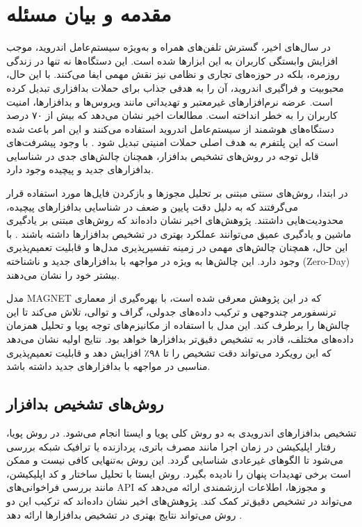 \section{مقدمه و بیان مسئله}\label{intro}
در سال‌های اخیر، گسترش تلفن‌های همراه و به‌ویژه سیستم‌عامل اندروید، موجب افزایش وابستگی کاربران به این ابزارها شده است. این دستگاه‌ها نه تنها در زندگی روزمره، بلکه در حوزه‌های تجاری و نظامی نیز نقش مهمی ایفا می‌کنند. با این حال، محبوبیت و فراگیری اندروید، آن را به هدفی جذاب برای حملات بدافزاری تبدیل کرده است. عرضه نرم‌افزارهای غیرمعتبر و تهدیداتی مانند ویروس‌ها و بدافزارها، امنیت کاربران را به خطر انداخته است. مطالعات اخیر نشان می‌دهد که بیش از ۷۰ درصد دستگاه‌های هوشمند از سیستم‌عامل اندروید استفاده می‌کنند و این امر باعث شده است که این پلتفرم به هدف اصلی حملات امنیتی تبدیل شود \cite{AndroidSecurity}. با وجود پیشرفت‌های قابل توجه در روش‌های تشخیص بدافزار، همچنان چالش‌های جدی در شناسایی بدافزارهای جدید و پیچیده وجود دارد.

در ابتدا، روش‌های سنتی مبتنی بر تحلیل مجوزها و بازکردن فایل‌ها مورد استفاده قرار می‌گرفتند که به دلیل دقت پایین و ضعف در شناسایی بدافزارهای پیچیده، محدودیت‌هایی داشتند. پژوهش‌های اخیر نشان داده‌اند که روش‌های مبتنی بر یادگیری ماشین و یادگیری عمیق می‌توانند عملکرد بهتری در تشخیص بدافزارها داشته باشند \cite{DeepLearningMalware}. با این حال، همچنان چالش‌های مهمی در زمینه تفسیرپذیری مدل‌ها و قابلیت تعمیم‌پذیری وجود دارد. این چالش‌ها به ویژه در مواجهه با بدافزارهای جدید و ناشناخته (Zero-Day) بیشتر خود را نشان می‌دهند.

مدل MAGNET که در این پژوهش معرفی شده است، با بهره‌گیری از معماری ترنسفورمر چندوجهی و ترکیب داده‌های جدولی، گراف و توالی، تلاش می‌کند تا این چالش‌ها را برطرف کند. این مدل با استفاده از مکانیزم‌های توجه پویا و تحلیل همزمان داده‌های مختلف، قادر به تشخیص دقیق‌تر بدافزارها خواهد بود. نتایج اولیه نشان می‌دهد که این رویکرد می‌تواند دقت تشخیص را تا ۹۸٪ افزایش دهد و قابلیت تعمیم‌پذیری مناسبی در مواجهه با بدافزارهای جدید داشته باشد.

\subsection{روش‌های تشخیص بدافزار}
تشخیص بدافزارهای اندرویدی به دو روش کلی پویا و ایستا انجام می‌شود. در روش پویا، رفتار اپلیکیشن در زمان اجرا مانند مصرف باتری، پردازنده یا ترافیک شبکه بررسی می‌شود تا الگوهای غیرعادی شناسایی گردد. این روش به‌تنهایی کافی نیست و ممکن است برخی تهدیدات پنهان را نادیده بگیرد. روش ایستا با تحلیل ساختار و کد اپلیکیشن، مانند بررسی فراخوانی‌های API و مجوزها، اطلاعات ارزشمندی ارائه می‌دهد که می‌تواند در تشخیص دقیق‌تر کمک کند. پژوهش‌های اخیر نشان داده‌اند که ترکیب این دو روش می‌تواند نتایج بهتری در تشخیص بدافزارها ارائه دهد \cite{AndroidMalwareSurvey}.

